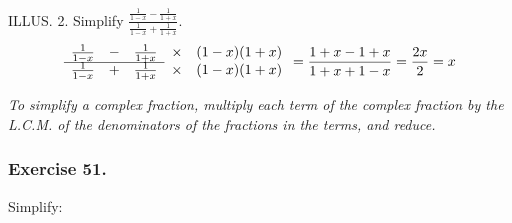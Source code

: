 \documentclass{book}
\begin{document}
ILLUS. 2. Simplify $\displaystyle \frac{ \frac{1}{1-x} -
\frac{1}{1+x} }
                         { \frac{1}{1-x} + \frac{1}{1+x} }$.
\[
\begin{array}{ccccc}
   \frac{1}{1-x} &-& \frac{1}{1+x} & \times & (1-x)(1+x)   \\
   \cline{1-3}
   \frac{1}{1-x} &+& \frac{1}{1+x} & \times & (1-x)(1+x)
\end{array}
           = \frac{1 + x - 1 + x}{1 + x + 1 - x} = \frac{2x}{2} = x
\]

\textit{To simplify a complex fraction, multiply each term of the
complex fraction by the L.C.M. of the denominators of the
fractions in the terms, and reduce.}

\subsubsection*{Exercise 51.}

Simplify:
\end{document}

